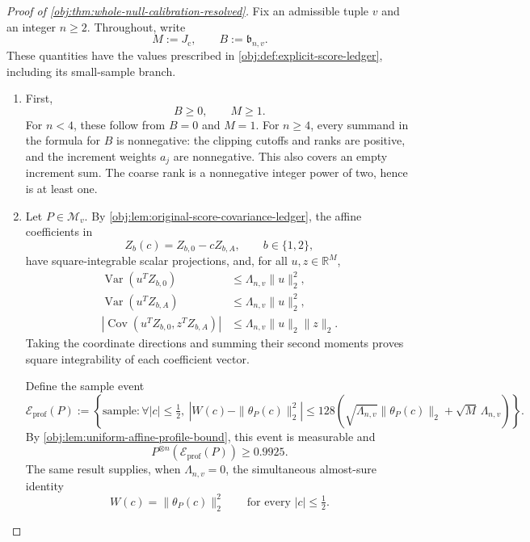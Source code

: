 \begin{proof}[Proof of \cref{obj:thm:whole-null-calibration-resolved}]
Fix an admissible tuple \(v\) and an integer \(n\ge2\). Throughout, write
\[
M:=J_{\mathrm c},
\qquad
B:=\mathfrak b_{n,v}.
\]
These quantities have the values prescribed in \cref{obj:def:explicit-score-ledger}, including its small-sample branch.

\begin{enumerate}
\item First,
\[
B\ge0,
\qquad
M\ge1.
\]
For \(n<4\), these follow from \(B=0\) and \(M=1\). For \(n\ge4\), every summand in the formula for \(B\) is nonnegative: the clipping cutoffs and ranks are positive, and the increment weights \(a_j\) are nonnegative. This also covers an empty increment sum. The coarse rank is a nonnegative integer power of two, hence is at least one.

\item Let \(P\in\mathcal M_v\). By \cref{obj:lem:original-score-covariance-ledger}, the affine coefficients in
\[
Z_b(c)=Z_{b,0}-cZ_{b,A},
\qquad b\in\{1,2\},
\]
have square-integrable scalar projections, and, for all \(u,z\in\mathbb R^M\),
\[
\begin{aligned}
\operatorname{Var}(u^T Z_{b,0})
&\le \Lambda_{n,v}\|u\|_2^2,\\
\operatorname{Var}(u^T Z_{b,A})
&\le \Lambda_{n,v}\|u\|_2^2,\\
\left|\operatorname{Cov}(u^T Z_{b,0},z^T Z_{b,A})\right|
&\le \Lambda_{n,v}\|u\|_2\|z\|_2.
\end{aligned}
\]
Taking the coordinate directions and summing their second moments proves square integrability of each coefficient vector.

Define the sample event
\[
\mathcal E_{\mathrm{prof}}(P)
:=
\left\{
\text{sample}:
\forall |c|\le\tfrac12,\ 
\left|W(c)-\|\theta_P(c)\|_2^2\right|
\le
128\left(
\sqrt{\Lambda_{n,v}}\|\theta_P(c)\|_2
+\sqrt M\,\Lambda_{n,v}
\right)
\right\}.
\]
By \cref{obj:lem:uniform-affine-profile-bound}, this event is measurable and
\[
P^{\otimes n}\!\left(\mathcal E_{\mathrm{prof}}(P)\right)\ge0.9925.
\]
The same result supplies, when \(\Lambda_{n,v}=0\), the simultaneous almost-sure identity
\[
W(c)=\|\theta_P(c)\|_2^2
\qquad\text{for every }|c|\le\tfrac12.
\]


\end{enumerate}
\end{proof}

